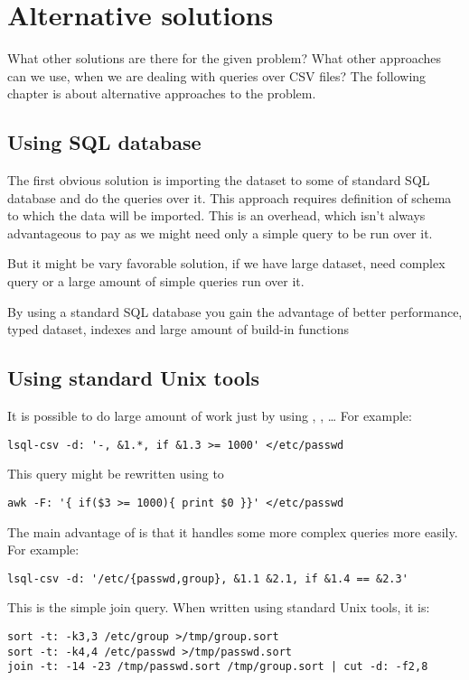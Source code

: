 
\chapter{Alternative solutions}
What other solutions are there for the given problem? What other approaches can we use, when we are dealing with queries over CSV files? 
The following chapter is about alternative approaches to the problem.

\section{Using SQL database}
The first obvious solution is importing the dataset to some of standard SQL database and do the queries over it. 
This approach requires definition of schema to which the data will be imported. This is an overhead, which isn't
always advantageous to pay as we might need only a simple query to be run over it.

But it might be vary favorable solution, if we have large dataset, need complex query or a large amount of simple queries run over it.

By using a standard SQL database you gain the advantage of better performance, typed dataset, indexes and large amount of build-in functions

\section{Using standard Unix tools}
It is possible to do large amount of work just by using , , \ldots
For example:

\begin{verbatim}
lsql-csv -d: '-, &1.*, if &1.3 >= 1000' </etc/passwd
\end{verbatim}

This query might be rewritten using  to
\begin{verbatim}
awk -F: '{ if($3 >= 1000){ print $0 }}' </etc/passwd
\end{verbatim}

The main advantage of  is that it handles some more complex queries more easily. For example:
\begin{verbatim}
lsql-csv -d: '/etc/{passwd,group}, &1.1 &2.1, if &1.4 == &2.3'
\end{verbatim}

This is the simple join query. When written using standard Unix tools, it is:
\begin{verbatim}
sort -t: -k3,3 /etc/group >/tmp/group.sort
sort -t: -k4,4 /etc/passwd >/tmp/passwd.sort
join -t: -14 -23 /tmp/passwd.sort /tmp/group.sort | cut -d: -f2,8 
\end{verbatim}

